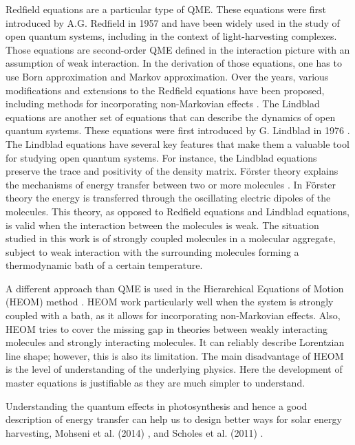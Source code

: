 Redfield equations are a particular type of QME. These equations were first introduced by A.G. Redfield in 1957 \cite{redfield_theory_1957} and have been widely used in the study of open quantum systems, including in the context of light-harvesting complexes. Those equations are second-order QME defined in the interaction picture with an assumption of weak interaction. In the derivation of those equations, one has to use Born approximation and Markov approximation. Over the years, various modifications and extensions to the Redfield equations have been proposed, including methods for incorporating non-Markovian effects \cite{breuer_theory_2002}.
The Lindblad equations are another set of equations that can describe the dynamics of open quantum systems. These equations were first introduced by G. Lindblad in 1976 \cite{lindblad_generators_1976}. The Lindblad equations have several key features that make them a valuable tool for studying open quantum systems. For instance, the Lindblad equations preserve the trace and positivity of the density matrix. %
Förster theory explains the mechanisms of energy transfer between two or more molecules \cite{forster_zwischenmolekulare_1948}. In Förster theory the energy is transferred through the oscillating electric dipoles of the molecules. This theory, as opposed to Redfield equations and Lindblad equations, is valid when the interaction between the molecules is weak. The situation studied in this work is of strongly coupled molecules in a molecular aggregate, subject to weak interaction with the surrounding molecules forming a thermodynamic bath of a certain temperature.

A different approach than QME is used in the Hierarchical Equations of Motion (HEOM) method \cite{tanimura_time_1989}. HEOM work particularly well when the system is strongly coupled with a bath, as it allows for incorporating non-Markovian effects. Also, HEOM tries to cover the missing gap in theories between weakly interacting molecules and strongly interacting molecules. It can reliably describe Lorentzian line shape; however, this is also its limitation. The main disadvantage of HEOM is the level of understanding of the underlying physics. Here the development of  master equations is justifiable as they are much simpler to understand. 

Understanding the quantum effects in photosynthesis and hence a good description of energy transfer can help us to design better ways for solar energy harvesting, Mohseni et al. (2014) \cite{mohseni_quantum_2014}, and Scholes et al. (2011) \cite{scholes_lessons_2011}.

